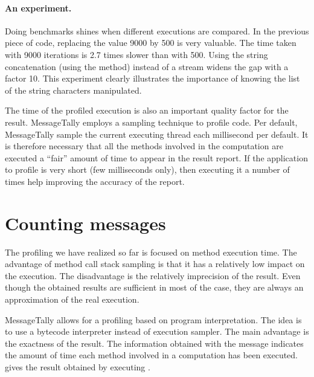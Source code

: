 \documentclass[a4paper,10pt,twoside]{book}
\begin{document}
\paragraph{An experiment.}
Doing benchmarks shines when different executions are compared. In the previous piece of code, replacing the value 9000 by 500 is very valuable. The time taken with 9000 iterations is 2.7 times slower than with 500. Using the string concatenation (\ie using the \ct{,} method) instead of a stream widens the gap with a factor 10. This experiment clearly illustrates the importance of knowing the list of the string characters manipulated. 

The time of the profiled execution is also an important quality factor for the result. MessageTally employs a sampling technique to profile code. Per default, MessageTally sample the current executing thread each millisecond per default. It is therefore necessary that all the methods involved in the computation are executed a ``fair'' amount of time to appear in the result report. If the application to profile is very short (few milliseconds only), then executing it a  number of times help improving the accuracy of the report. 



\section{Counting messages}
The profiling we have realized so far is focused on method execution time. The advantage of method call stack sampling is that it has a relatively low impact on the execution. The disadvantage is the relatively imprecision of the result. Even though the obtained results are sufficient in most of the case, they are always an approximation of the real execution.

MessageTally allows for a profiling based on program interpretation. The idea is to use a bytecode interpreter instead of execution sampler. The main advantage is the exactness of the result. The information obtained with the message  indicates the amount of time each method involved in a computation has been executed.  gives the result obtained by executing .
\end{document}
